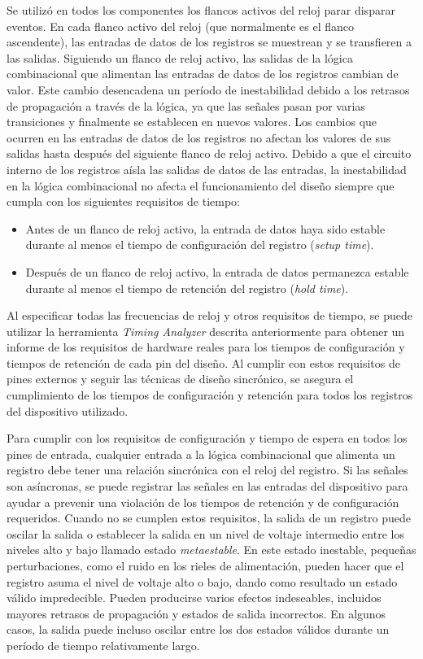 Se utilizó en todos los componentes los flancos activos del reloj parar disparar eventos. En cada flanco activo del reloj (que normalmente es el flanco ascendente), las entradas de datos de los registros se muestrean y se transfieren a las salidas. Siguiendo un flanco de reloj activo, las salidas de la lógica combinacional que alimentan las entradas de datos de los registros cambian de valor. Este cambio desencadena un período de inestabilidad debido a los retrasos de propagación a través de la lógica, ya que las señales pasan por varias transiciones y finalmente se establecen en nuevos valores. Los cambios que ocurren en las entradas de datos de los registros no afectan los valores de sus salidas hasta después del siguiente flanco de reloj activo. Debido a que el circuito interno de los registros aísla las salidas de datos de las entradas, la inestabilidad en la lógica combinacional no afecta el funcionamiento del diseño siempre que cumpla con los siguientes requisitos de tiempo:

\begin{itemize}
\item
Antes de un flanco de reloj activo, la entrada de datos haya sido estable durante al menos el tiempo de configuración del registro (\textit{setup time}).
  
\item
Después de un flanco de reloj activo, la entrada de datos permanezca estable durante al menos el tiempo de retención del registro (\textit{hold time}).
  
\end{itemize}

Al especificar todas las frecuencias de reloj y otros requisitos de tiempo, se puede utilizar la herramienta \textit{Timing Analyzer} descrita anteriormente para obtener un informe de los requisitos de hardware reales para los tiempos de configuración y tiempos de retención de cada pin del diseño. Al cumplir con estos requisitos de pines externos y seguir las técnicas de diseño sincrónico, se asegura el cumplimiento de los tiempos de configuración y retención para todos los registros del dispositivo utilizado.

Para cumplir con los requisitos de configuración y tiempo de espera en todos los pines de entrada, cualquier entrada a la lógica combinacional que alimenta un registro debe tener una relación sincrónica con el reloj del registro. Si las señales son asíncronas, se puede registrar las señales en las entradas del dispositivo para ayudar a prevenir una violación de los tiempos de retención y de configuración requeridos. Cuando no se cumplen estos requisitos, la salida de un registro puede oscilar la salida o establecer la salida en un nivel de voltaje intermedio entre los niveles alto y bajo llamado estado \textit{metaestable}. En este estado inestable, pequeñas perturbaciones, como el ruido en los rieles de alimentación, pueden hacer que el registro asuma el nivel de voltaje alto o bajo, dando como resultado un estado válido impredecible. Pueden producirse varios efectos indeseables, incluidos mayores retrasos de propagación y estados de salida incorrectos. En algunos casos, la salida puede incluso oscilar entre los dos estados válidos durante un período de tiempo relativamente largo.

